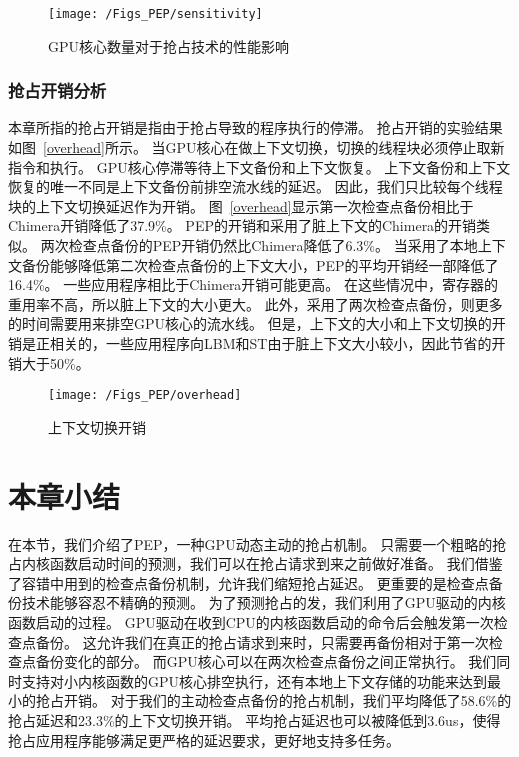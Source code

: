\begin{figure}[htbp] %
  \centering
  \texttt{[image: /Figs\_PEP/sensitivity]}
  \caption{GPU核心数量对于抢占技术的性能影响}
  \label{fig:sensitivity}
\end{figure}

\subsubsection{抢占开销分析}

本章所指的抢占开销是指由于抢占导致的程序执行的停滞。
抢占开销的实验结果如图~\ref{overhead}所示。
当GPU核心在做上下文切换，切换的线程块必须停止取新指令和执行。
GPU核心停滞等待上下文备份和上下文恢复。
上下文备份和上下文恢复的唯一不同是上下文备份前排空流水线的延迟。
因此，我们只比较每个线程块的上下文切换延迟作为开销。
图~\ref{overhead}显示第一次检查点备份相比于Chimera开销降低了37.9\%。
PEP的开销和采用了脏上下文的Chimera的开销类似。
两次检查点备份的PEP开销仍然比Chimera降低了6.3\%。
当采用了本地上下文备份能够降低第二次检查点备份的上下文大小，PEP的平均开销经一部降低了16.4\%。
一些应用程序相比于Chimera开销可能更高。
在这些情况中，寄存器的重用率不高，所以脏上下文的大小更大。
此外，采用了两次检查点备份，则更多的时间需要用来排空GPU核心的流水线。
但是，上下文的大小和上下文切换的开销是正相关的，一些应用程序向LBM和ST由于脏上下文大小较小，因此节省的开销大于50\%。

\begin{figure}[htbp] %
  \centering
  \texttt{[image: /Figs\_PEP/overhead]}
  \caption{上下文切换开销}
  \label{fig:overhead}
\end{figure}


\section{本章小结}

在本节，我们介绍了PEP，一种GPU动态主动的抢占机制。
只需要一个粗略的抢占内核函数启动时间的预测，我们可以在抢占请求到来之前做好准备。
我们借鉴了容错中用到的检查点备份机制，允许我们缩短抢占延迟。
更重要的是检查点备份技术能够容忍不精确的预测。
为了预测抢占的发，我们利用了GPU驱动的内核函数启动的过程。
GPU驱动在收到CPU的内核函数启动的命令后会触发第一次检查点备份。
这允许我们在真正的抢占请求到来时，只需要再备份相对于第一次检查点备份变化的部分。
而GPU核心可以在两次检查点备份之间正常执行。
我们同时支持对小内核函数的GPU核心排空执行，还有本地上下文存储的功能来达到最小的抢占开销。
对于我们的主动检查点备份的抢占机制，我们平均降低了58.6\%的抢占延迟和23.3\%的上下文切换开销。
平均抢占延迟也可以被降低到3.6us，使得抢占应用程序能够满足更严格的延迟要求，更好地支持多任务。